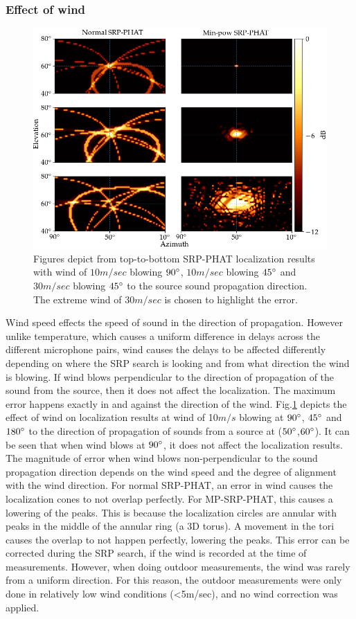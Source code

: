 \subsubsection{Effect of wind}
\begin{figure}[H]
\centering
\includegraphics[width=\textwidth]{Figures/windSim.png}
\caption{Figures depict from top-to-bottom SRP-PHAT localization results with wind of $10 m/sec$ blowing $90\degree$, $10 m/sec$ blowing $45\degree$ and $30 m/sec$ blowing $45\degree$ to the source sound propagation direction. The extreme wind of $30 m/sec$ is chosen to highlight the error.}
\label{fig:4mic2srcWind}
\end{figure}
Wind speed effects the speed of sound in the direction of propagation. However unlike temperature, which causes a uniform difference in delays across the different microphone pairs, wind causes the delays to be affected differently depending on where the SRP search is looking and from what direction the wind is blowing. If wind blows perpendicular to the direction of propagation of the sound from the source, then it does not affect the localization. The maximum error happens exactly in and against the direction of the wind. Fig.\ref{fig:4mic2srcWind} depicts the effect of wind on localization results at wind of 10$m/s$ blowing at $90\degree$, $45\degree$ and $180\degree$ to the direction of propagation of sounds from a source at ($50\degree$,$60\degree$). It can be seen that when wind blows at $90\degree$, it does not affect the localization results. The magnitude of error when wind blows non-perpendicular to the sound propagation direction depends on the wind speed and the degree of alignment with the wind direction. For normal SRP-PHAT, an error in wind causes the localization cones to not overlap perfectly. For MP-SRP-PHAT, this causes a lowering of the peaks. This is because the localization circles are annular with peaks in the middle of the annular ring (a 3D torus). A movement in the tori causes the overlap to not happen perfectly, lowering the peaks. This error can be corrected during the SRP search, if the wind is recorded at the time of measurements. However, when doing outdoor measurements, the wind was rarely from a uniform direction. For this reason, the outdoor measurements were only done in relatively low wind conditions (<5m/sec), and no wind correction was applied.
